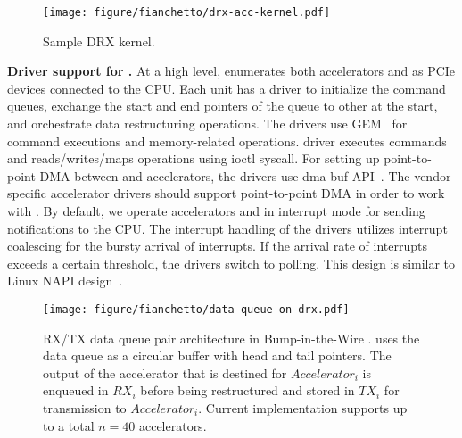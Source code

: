 \begin{figure}[t]
    \centering
    \texttt{[image: figure/fianchetto/drx-acc-kernel.pdf]}
    \caption{Sample DRX kernel.}
    \label{fig:drx-acc-kernel}
\end{figure}

\noindent \textbf{Driver support for \dmx.} 
At a high level, \dmx enumerates both accelerators and \drxs as PCIe devices connected to the CPU.  
%
%
Each \drx unit has a driver to initialize the command queues, exchange the start and end pointers of the queue to other \drxs at the start, and orchestrate data restructuring operations. 
%
The drivers use GEM~\cite{linux-drm-gem,linux-gem-lwn} for command executions and memory-related operations. \drx driver executes commands and reads/writes/maps operations using ioctl syscall. 
%
For setting up point-to-point DMA between \drx and accelerators, the drivers use dma-buf API~\cite{dma_buf:kernel:2022}.
%
The vendor-specific accelerator drivers should support point-to-point DMA in order to work with \dmx.
By default, we operate accelerators and \drxs in interrupt mode for sending notifications to the CPU. The interrupt handling of the drivers utilizes interrupt coalescing for the bursty arrival of interrupts. 
%
If the arrival rate of interrupts exceeds a certain threshold, the drivers switch to polling. This design is similar to Linux NAPI design~\cite{napi:kernel:2022}.

\begin{figure}[t!]
    \centering
    \texttt{[image: figure/fianchetto/data-queue-on-drx.pdf]}
    \caption{ 
    RX/TX data queue pair architecture in Bump-in-the-Wire \drx. \drx uses the data queue as a circular buffer with head and tail pointers. The output of the accelerator that is destined for ${Accelerator}_{i}$ is enqueued in \textit{$RX_{i}$} before being restructured and stored in \textit{$TX_{i}$} for transmission to ${Accelerator}_{i}$. Current \drx implementation supports up to a total $n=40$ accelerators.
    }
    \label{fig:system:data-queue}
\end{figure}

